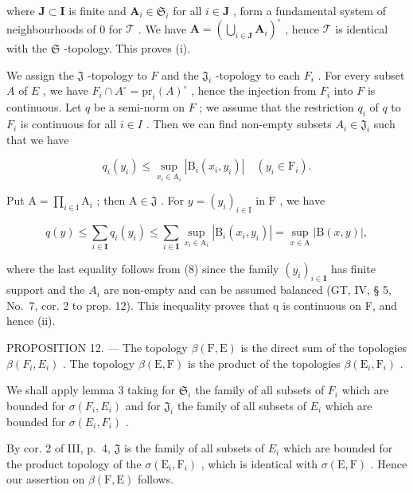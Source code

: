 where \(\mathbf{J} \subset \mathbf{I}\) is finite and \(\mathbf{A}_i \in \mathfrak{S}_i\) for all \(i \in \mathbf{J}\) , form a fundamental system of neighbourhoods of 0 for \(\mathcal{T}\) . We have \(\mathbf{A} = (\bigcup_{i \in \mathbf{J}} \mathbf{A}_i)^\circ\) , hence \(\mathcal{T}\) is identical with the \(\mathfrak{S}\) -topology. This proves (i).

We assign the \(\mathfrak{J}\) -topology to \(F\) and the \(\mathfrak{J}_i\) -topology to each \(F_i\) . For every subset \(A\) of \(E\) , we have \(F_i \cap A^\circ = \text{pr}_i(A)^\circ\) , hence the injection from \(F_i\) into \(F\) is continuous. Let \(q\) be a semi-norm on \(F\) ; we assume that the restriction \(q_i\) of \(q\) to \(F_i\) is continuous for all \(i \in I\) . Then we can find non-empty subsets \(A_i \in \mathfrak{J}_i\) such that we have

\[
q _ {i} \left(y _ {i}\right) \leqslant \sup _ {x _ {i} \in \mathrm{A} _ {i}} \left| \mathrm{B} _ {i} \left(x _ {i}, y _ {i}\right) \right| \quad \left(y _ {i} \in \mathrm{F} _ {i}\right).\tag{9}
\]

Put \(\mathrm{A} = \prod_{i\in \mathrm{I}}\mathrm{A}_i\) ; then \(\mathrm{A}\in \mathfrak{J}\) . For \(y = (y_i)_{i\in \mathrm{I}}\) in \(\mathrm{F}\) , we have

\[
q (y) \leqslant \sum_ {i \in \mathbf {I}} q _ {i} (y _ {i}) \leqslant \sum_ {i \in \mathbf {I}} \sup _ {x _ {i} \in \mathrm{A} _ {i}} | \mathrm{B} _ {i} (x _ {i}, y _ {i}) | = \sup _ {x \in \mathrm{A}} | \mathrm{B} (x, y) |,
\]

where the last equality follows from (8) since the family \((y_{i})_{i\in\mathbf{I}}\) has finite support and the \(A_{i}\) are non-empty and can be assumed balanced (GT, IV, § 5, No.~7, cor. 2 to prop. 12). This inequality proves that q is continuous on F, and hence (ii).

PROPOSITION 12. --- The topology \(\beta(\mathrm{F},\mathrm{E})\) is the direct sum of the topologies \(\beta(F_i,E_i)\) . The topology \(\beta(\mathrm{E},\mathrm{F})\) is the product of the topologies \(\beta(\mathrm{E}_i,\mathrm{F}_i)\) .

We shall apply lemma 3 taking for \(\mathfrak{S}_i\) the family of all subsets of \(F_i\) which are bounded for \(\sigma(F_i, E_i)\) and for \(\mathfrak{J}_i\) the family of all subsets of \(E_i\) which are bounded for \(\sigma(E_i, F_i)\) .

By cor. 2 of III, p.~4, \(\mathfrak{J}\) is the family of all subsets of \(E_{i}\) which are bounded for the product topology of the \(\sigma(\mathrm{E}_{i}, \mathrm{F}_{i})\) , which is identical with \(\sigma(\mathrm{E}, \mathrm{F})\) . Hence our assertion on \(\beta(\mathrm{F}, \mathrm{E})\) follows.

